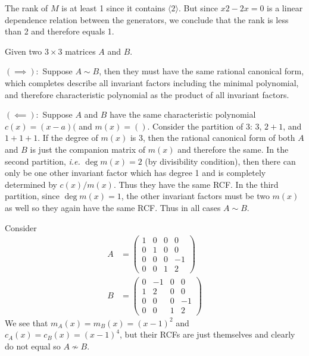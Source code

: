 \documentclass[12pt]{article}
\begin{document}
\begin{problem}[3]
The rank of $ M$ is at least 1 since it contains $ \langle 2 \rangle$. But since $ x2-2x = 0$ is a linear dependence relation between the generators, we conclude that the rank is less than 2 and therefore equals 1.
\end{problem}

\begin{problem}[4]
Given two $ 3\times 3$ matrices $ A$ and  $ B$.

$ (\implies):$ Suppose $ A \sim B$, then they must have the same rational canonical form, which completes describe all invariant factors including the minimal polynomial, and therefore characteristic polynomial as the product of all invariant factors.

$ (\impliedby):$ Suppose $ A$ and  $ B$ have the same characteristic polynomial  $ c(x) = (x-a)($ and  $ m(x) = ()$. Consider the partition of 3:  $ 3$,  $ 2+1$, and  $ 1+1+1$.  If the degree of $ m(x)$ is 3, then the rational canonical form of both  $ A$ and  $ B$ is just the companion matrix of  $ m(x)$ and therefore the same. In the second partition, \emph{i.e.} $ \deg m(x) = 2$ (by divisibility condition), then there can only be one other invariant factor which has degree 1 and is completely determined by $ c(x) / m(x)$. Thus they have the same RCF. In the third partition, since $ \deg m(x) = 1$, the other invariant factors must be two  $ m(x)$ as well so they again have the same RCF. Thus in all cases $ A \sim B$.

Consider
\begin{align*}
	A &= \begin{pmatrix} 1&0&0&0\\0&1&0&0\\0&0&0&-1\\0&0&1&2 \end{pmatrix} \\
	B &= \begin{pmatrix} 0&-1&0&0\\1&2&0&0\\0&0&0&-1\\0&0&1&2 \end{pmatrix} 
\end{align*}
We see that $ m_A(x) = m_B(x) = (x-1)^2$ and $ c_A(x) = c_B(x) = (x-1)^{4}$, but their RCFs are just themselves and clearly do not equal so $ A \not \sim B$.
\end{problem}
\end{document}
